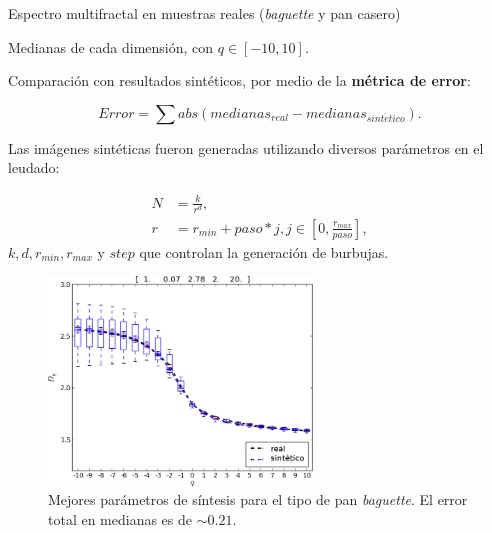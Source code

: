 \documentclass[spanish,unknownkeysallowed]{beamer}
\begin{document}
\begin{frame}
Espectro multifractal en muestras reales ({\em baguette} y pan casero)

Medianas de cada dimensión, con $q \in [-10,10]$.

Comparación con resultados sintéticos, por medio de la \textbf{métrica de error}:

\begin{equation*}
Error = \displaystyle \sum abs(medianas_{real}-medianas_{sint\acute{e}tico}).
\end{equation*}

Las imágenes sintéticas fueron generadas utilizando diversos parámetros en el leudado:

\begin{align*}
N &= \frac{k}{r^{d}},\\ r &= r_{min}+paso*j, j \in [0,\frac{r_{max}}{paso}],
\end{align*}
\noindent $k,d,r_{min},r_{max}$ y $step$ que controlan la generación de burbujas.

\end{frame}

\begin{frame}
\begin{figure}[!ht]
\includegraphics[width=7cm]{../figures/bestboxplot}
\caption[Mejores parámetros de síntesis para el tipo de pan {\em baguette}]{Mejores parámetros de síntesis para el tipo de pan {\em baguette}. El error total en medianas es de $\sim 0.21$.}
\label{bestboxplot}
\end{figure}

\end{frame}
\end{document}
